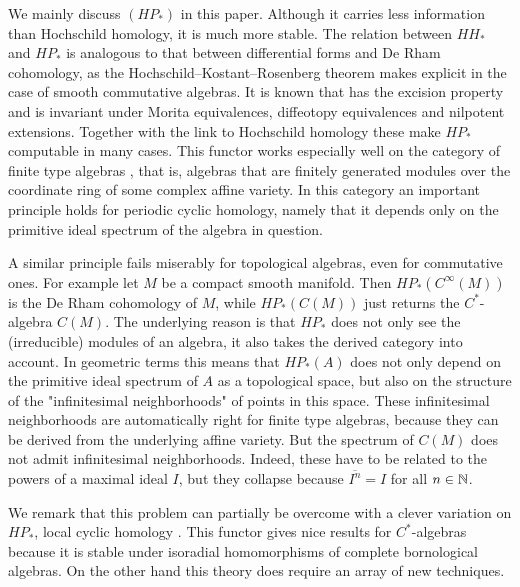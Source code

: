 We mainly discuss \pch $(HP_* )$ in this paper. Although it carries less information 
than Hochschild homology, it is much more stable. The relation between $HH_*$ 
and $HP_*$ is analogous to that between differential forms and De Rham 
cohomology, as the Hochschild--Kostant--Rosenberg theorem makes explicit in the 
case of smooth commutative algebras. It is known that \pch has the excision 
property and is invariant under Morita equivalences, diffeotopy equivalences and
nilpotent extensions.
Together with the link to Hochschild homology these make $HP_*$ computable
in many cases. This functor works especially well on the category of finite type
algebras \cite{KNS}, that is, algebras that are finitely generated modules over the
coordinate ring of some complex affine variety. In this category an important 
principle holds for periodic cyclic homology, namely that it depends only on 
the primitive ideal spectrum of the algebra in question.

A similar principle fails miserably for topological algebras, even for commutative 
ones. For example let $M$ be a compact smooth manifold. Then 
$HP_* (C^\infty (M))$ is the De Rham cohomology of $M$, while $HP_* (C(M))$
just returns the $C^*$-algebra $C(M)$. The underlying reason is that $HP_*$
does not only see the (irreducible) modules of an algebra, it also takes the 
derived category into account. In geometric terms this means that $HP_* (A)$
does not only depend on the primitive ideal spectrum of $A$ as a topological 
space, but also on the structure of the "infinitesimal neighborhoods" of points
in this space. These infinitesimal neighborhoods are automatically right for 
finite type algebras, because they can be derived from the underlying affine variety.
But the spectrum of $C(M)$ does not admit infinitesimal neighborhoods. Indeed,
these have to be related to the powers of a maximal ideal $I$, but they collapse
because $\overline{I^n} = I$ for all $n \in \mathbb N$.

We remark that this problem can partially be overcome with a clever variation
on $HP_*$, local cyclic homology \cite{Mey3}. This functor gives nice results for
$C^*$-algebras because it is stable under isoradial homomorphisms of complete 
bornological algebras. On the other hand this theory does require an array of new 
techniques.

